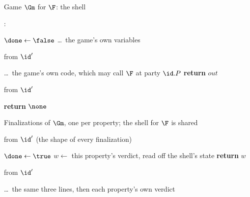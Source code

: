 \documentclass[10pt,oneside,openany]{book}
\theoremstyle{accentdef}
\theoremstyle{accentplain}
\begin{document}
\begin{interface}[nofloat]{Game $\Gm$ for $\F$: the shell \\
}

:
\begin{algorithmic}[1]
\setcounter{contline}{0}\algcont
\State $\done \gets \false$
\State \dots\ the game's own variables
\algsave
\end{algorithmic}
\vspace{1.4ex}

 \quad from $\id'$
\begin{algorithmic}[1]
\algcont
\Req{$\neg\done$} \label{ln:gmopen}
\State \dots\ the game's own code, which may call $\F$ at party $\id.P$
\State \textbf{return} $out$
\algsave
\end{algorithmic}
\vspace{1.4ex}

 \quad from $\id'$
\begin{algorithmic}[1]
\algcont
\State \textbf{return} $\none$
\algsave
\end{algorithmic}
\end{interface}

\begin{interface}[nofloat]{Finalizations of $\Gm$, one per property; the shell for $\F$ is shared \\
}

 \quad from $\id'$ \quad (the shape of every finalization)
\begin{algorithmic}[1]
\algcont
\Req{$\neg\done$} \label{ln:gmonce}
 \label{ln:gmroot}
\State $\done \gets \true$ \label{ln:gmdone}
\State $w \gets$ this property's verdict, read off the shell's state \label{ln:gmwin}
\State \textbf{return} $w$
\algsave
\end{algorithmic}
\vspace{1.4ex}

 \quad from $\id'$
\begin{algorithmic}[1]
\algcont
\State \dots\ the same three lines, then each property's own verdict
\algsave
\end{algorithmic}
\end{interface}
\end{document}
